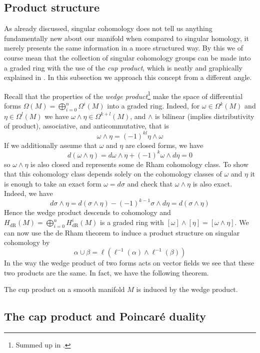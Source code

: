 \documentclass[a4paper, 12pt]{article}
\begin{document}
\subsection{Product structure}

As already discussed, singular cohomology does not tell us anything
fundamentally new about our manifold when compared to singular homology, it
merely presents the same information in a more structured way.  By this we of
course mean that the collection of singular cohomology groups can be made into
a graded ring with the use of the \emph{cup product}, which is neatly and
graphically explained in \cite[Section 3.2]{Hatcher2002}.
In this subsection we approach this concept from a different angle.

Recall that the properties of the \emph{wedge product}\footnote{Summed up in \cite[Prop. 14.11]{Lee2012}.}
make the space of differential forms $\Omega(M) = \bigoplus_{i=0}^n\Omega^i(M)$ into a graded ring.
Indeed, for $\omega \in \Omega^k(M)$ and $\eta \in \Omega^l(M)$ we have $\omega\wedge\eta \in \Omega^{k+l}(M)$,
and $\wedge$ is bilinear (implies distributivity of product), associative, and anticommutative, that is
\[
    \omega\wedge\eta = (-1)^{kl}\eta\wedge\omega
\]
If we additionally assume that $\omega$ and $\eta$ are closed forms, we have
\[
    d(\omega\wedge\eta) = d\omega\wedge\eta + (-1)^k\omega\wedge d\eta = 0
\]
so $\omega\wedge\eta$ is also closed and represents some de Rham cohomology class.
To show that this cohomology class depends solely on the cohomology classes of $\omega$ and $\eta$ it is enough to take an exact form $\omega = d\sigma$ and check that $\omega\wedge\eta$ is also exact.
Indeed, we have
\[
    d\sigma\wedge\eta
    = d(\sigma\wedge\eta) - (-1)^{k-1}\sigma\wedge d\eta
    = d(\sigma\wedge\eta)
\]
Hence the wedge product descends to cohomology and $H_{\text{dR}}(M) = \bigoplus_{i=0}^n H_{\text{dR}}^i(M)$ is a graded ring with $[\omega]\wedge[\eta] = [\omega\wedge\eta]$.
We can now use the de Rham theorem to induce a product structure on singular cohomology by
\[
    \alpha \cup \beta = \ell(\ell^{-1}(\alpha)\wedge\ell^{-1}(\beta))
\]
In the way the wedge product of two forms acts on vector fields we see that these two products are the same.
In fact, we have the following theorem.
\begin{theorem}
    The cup product on a smooth manifold $M$ is induced by the wedge product.
\end{theorem}

\subsection{The cap product and Poincar\'e duality}
\end{document}
